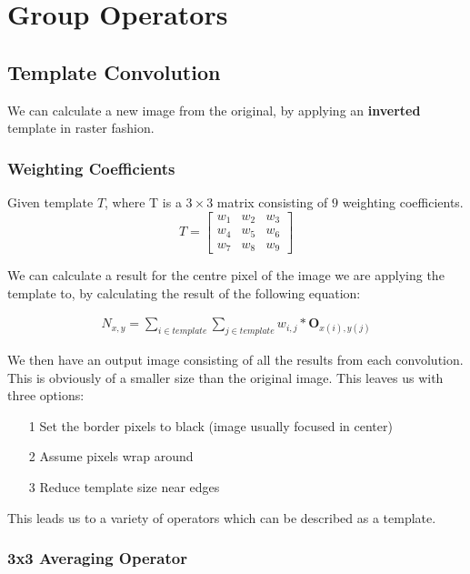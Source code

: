 \section{Group Operators}

\subsection{Template Convolution}
We can calculate a new image from the original, by applying an \textbf{inverted} template in raster fashion.

\subsubsection{Weighting Coefficients}

Given template $T$, where T is a $3\times 3$ matrix consisting of $9$ weighting coefficients.
\begin{equation} T = 
\begin{bmatrix}
w_{1} & w_{2} & w_{3} \\
w_{4} & w_{5} & w_{6} \\
w_{7} & w_{8} & w_{9}
\end{bmatrix}
\end{equation}

We can calculate a result for the centre pixel of the image we are applying the template to, by calculating the result of the following equation:

\begin{align}
    N_{x,y} = \sum_{i \in template} \sum_{j\in template} w_{i,j} * \mathbf{O}_{x(i),y(j)}
\end{align}

We then have an output image consisting of all the results from each convolution. This is obviously of a smaller size than the original image. This leaves us with three options:

\begin{itemize}
    \itemsep0em
    \item [1] Set the border pixels to black (image usually focused in center)
    \item [2] Assume pixels wrap around 
    \item [3] Reduce template size near edges
\end{itemize}

This leads us to a variety of operators which can be described as a template.

\subsubsection{3x3 Averaging Operator}

